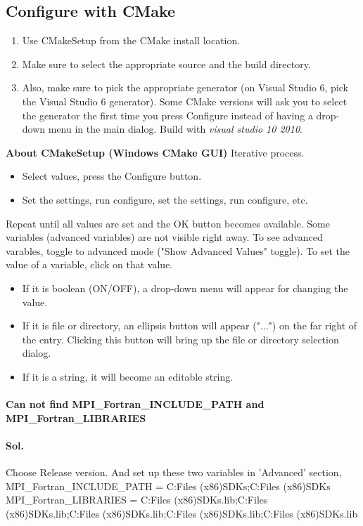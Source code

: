 \subsection{Configure with CMake}
\begin{enumerate}
\item Use CMakeSetup from the CMake install location.
\item Make sure to select the appropriate source and the build directory.
\item Also, make sure to pick the appropriate generator (on Visual Studio 6, pick the Visual Studio 6 generator).
Some CMake versions will ask you to select the generator the first time you press Configure instead of having a drop-down menu in the main dialog.
Build with \emph{visual studio 10 2010}. \end{enumerate}
{\bf About CMakeSetup (Windows CMake GUI)}
Iterative process. \begin{itemize}\item  Select values, press the Configure button.
\item Set the settings, run configure, set the settings, run configure, etc.\end{itemize}

Repeat until all values are set and the OK button becomes available.
Some variables (advanced variables) are not visible right away.
To see advanced varables, toggle to advanced mode ("Show Advanced Values" toggle).
To set the value of a variable, click on that value. \begin{itemize}
\item If it is boolean (ON/OFF), a drop-down menu will appear for changing the value.
\item If it is file or directory, an ellipsis button will appear ("...") on the far right of the entry. Clicking this button will bring up the file or directory selection dialog.
\item If it is a string, it will become an editable string. \end{itemize}

\paragraph{Can not find MPI_Fortran_INCLUDE_PATH and MPI_Fortran_LIBRARIES} 
\paragraph{Sol.} Choose Release version. And set up these two variables in 'Advanced' section, 
MPI_Fortran_INCLUDE_PATH = C:\Program Files (x86)\Microsoft SDKs\MPI\Include;C:\Program Files (x86)\Microsoft SDKs\MPI\Include{} 
MPI_Fortran_LIBRARIES = C:\Program Files (x86)\Microsoft SDKs\MPI\Lib{}\msmpi.lib;C:\Program Files (x86)\Microsoft SDKs\MPI\Lib{}\msmpifec.lib;C:\Program Files (x86)\Microsoft SDKs\MPI\Lib{}\msmpifes.lib;C:\Program Files (x86)\Microsoft SDKs\MPI\Lib{}\msmpifmc.lib;C:\Program Files (x86)\Microsoft SDKs\MPI\Lib{}\msmpifms.lib

